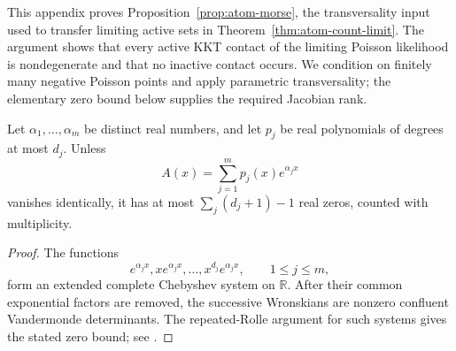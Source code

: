 This appendix proves Proposition~\ref{prop:atom-morse}, the transversality
input used to transfer limiting active sets in
Theorem~\ref{thm:atom-count-limit}. The argument shows that every active KKT
contact of the limiting Poisson likelihood is nondegenerate and that no inactive contact
occurs. We condition on finitely many negative Poisson points and apply
parametric transversality; the elementary zero bound below supplies the
required Jacobian rank.

\begin{lemma}
\label{lem:atom-exp-polynomial}
Let \(\alpha_1,\ldots,\alpha_m\) be distinct real numbers, and let \(p_j\)
be real polynomials of degrees at most \(d_j\). Unless
\[
    A(x)=\sum_{j=1}^mp_j(x)e^{\alpha_jx}
\]
vanishes identically, it has at most
\(\sum_j(d_j+1)-1\) real zeros, counted with multiplicity.
\end{lemma}

\begin{proof}
The functions
\[
    e^{\alpha_jx},xe^{\alpha_jx},\ldots,x^{d_j}e^{\alpha_jx},
    \qquad 1\le j\le m,
\]
form an extended complete Chebyshev system on \(\mathbb R\). After their
common exponential factors are removed, the successive Wronskians are
nonzero confluent Vandermonde determinants. The repeated-Rolle argument for
such systems gives the stated zero bound; see
\cite[Chapter~I]{karlin1966tchebycheff}.
\end{proof}

